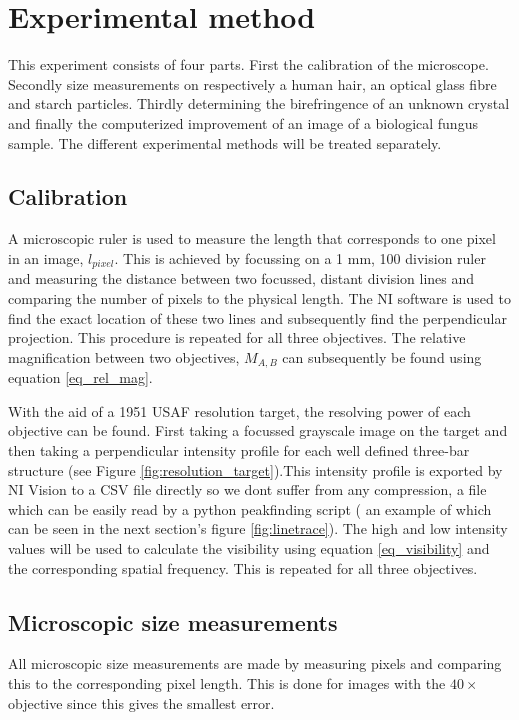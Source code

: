 \section{Experimental method}

This experiment consists of four parts. First the calibration of the microscope. Secondly size measurements on respectively a human hair, an optical glass fibre and starch particles. Thirdly determining the birefringence of an unknown crystal and finally the computerized improvement of an image of a biological fungus sample. The different experimental methods will be treated separately.

\subsection{Calibration}
A microscopic ruler is used to measure the length that corresponds to one pixel in an image, $l_{pixel}$. This is achieved by focussing on a 1 mm, 100 division ruler and measuring the distance between two focussed, distant division lines and comparing the number of pixels to the physical length. The NI software is used to find the exact location of these two lines and subsequently find the perpendicular projection. This procedure is repeated for all three objectives. The relative magnification between two objectives, $M_{A,B}$ can subsequently be found using equation \ref{eq_rel_mag}.

\bigskip
With the aid of a 1951 USAF resolution target, the resolving power of each objective can be found. First taking a focussed grayscale image  on the target and then taking a perpendicular intensity profile for each well defined three-bar structure (see Figure \ref{fig:resolution_target}).This intensity profile is exported by NI Vision to a CSV file directly so we dont suffer from any compression, a file which can be easily read by a python peakfinding script ( an example of which can be seen in the next section's figure \ref{fig:linetrace}). The high and low intensity values will be used to calculate the visibility using equation \ref{eq_visibility} and the corresponding spatial frequency. This is repeated for all three objectives.\\

\subsection{Microscopic size measurements}

All microscopic size measurements are made by measuring pixels and comparing this to the corresponding pixel length. This is done for images with the $40\times$ objective since this gives the smallest error.

